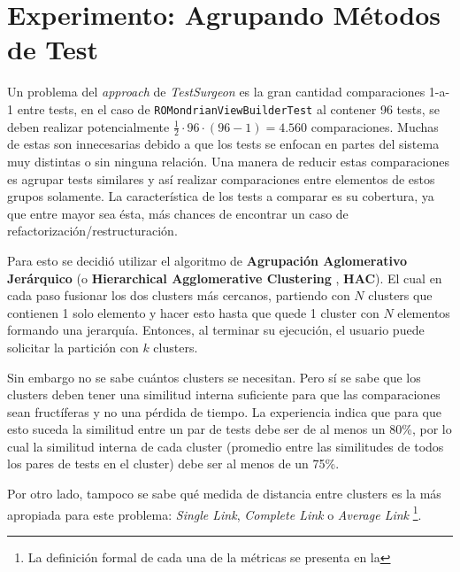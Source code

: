 
\chapter{Experimento: Agrupando Métodos de Test}

\par Un problema del \emph{approach} de \emph{TestSurgeon} es la gran cantidad  comparaciones 1-a-1 entre tests, en el caso de {\tt ROMondrianViewBuilderTest} al contener 96 tests, se deben realizar potencialmente $\frac{1}{2} \cdot 96 \cdot (96-1) = 4.560$ comparaciones. Muchas de estas son innecesarias debido a que los tests se enfocan en partes del sistema muy distintas o sin ninguna relación. Una manera de reducir estas comparaciones es agrupar tests similares y así realizar comparaciones entre elementos de estos grupos solamente. La característica de los tests a comparar es su cobertura, ya que entre mayor sea ésta, más chances de encontrar un caso de refactorización/restructuración. 

\par Para esto se decidió utilizar el algoritmo de \textbf{Agrupación Aglomerativo Jerárquico} (o \textbf{Hierarchical Agglomerative Clustering }, \textbf{HAC}). El cual en cada paso fusionar los dos clusters más cercanos, partiendo con $N$ clusters que contienen 1 solo elemento y hacer esto hasta que quede 1 cluster con $N$ elementos formando una jerarquía. Entonces, al terminar su ejecución, el usuario puede solicitar la partición con $k$ clusters. 

\par Sin embargo no se sabe cuántos clusters se necesitan. Pero sí se sabe que los clusters deben tener una similitud interna suficiente para que las comparaciones sean fructíferas y no una pérdida de tiempo. La experiencia indica que para que esto suceda la similitud entre un par de tests debe ser de al menos un 80\%, por lo cual la similitud interna de cada cluster (promedio entre las similitudes de todos los pares de tests en el cluster) debe ser al menos de un 75\%. 

\par Por otro lado, tampoco se sabe qué medida de distancia entre clusters es la más apropiada para este problema: \emph{Single Link}, \emph{Complete Link} o \emph{Average Link} \footnote{La definición formal de cada una de la métricas se presenta en la }.  

